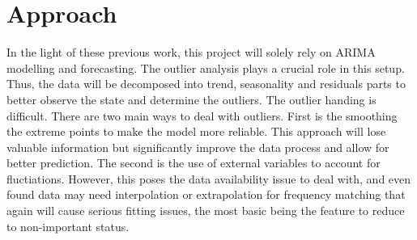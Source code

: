 \documentclass[11pt, a4paper, leqno]{article}
\begin{document}
\section{Approach} %
\label{sec:appro}

In the light of these previous work, this project will solely rely on ARIMA modelling and forecasting.
The outlier analysis plays a crucial role in this setup. Thus, the data will be decomposed into trend, seasonality and residuals parts to better observe the state and determine the outliers.
The outlier handing is difficult. There are two main ways to deal with outliers. First is the smoothing the extreme points to make the model more reliable. This approach will lose valuable information but significantly improve the data process and allow for better prediction. The second is the use of external variables to account for fluctiations. However, this poses the data availability issue to deal with, and even found data may need interpolation or extrapolation for frequency matching that again will cause serious fitting issues, the most basic being the feature to reduce to non-important status.









\printbibliography
{}



\end{document}
